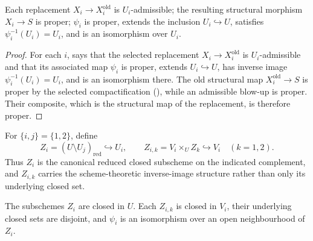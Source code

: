 \begin{lemma}
  \label{lemma:nagata-two-open-graph-extensions}
  \leanok

  Each replacement $X_i\to X_i^{\mathrm{old}}$ is $U_i$-admissible;
  the resulting structural morphism $X_i\to S$ is proper;
  $\psi_i$ is proper, extends the inclusion $U_i\hookrightarrow U$, satisfies
  $\psi_i^{-1}(U_i)=U_i$, and is an isomorphism over $U_i$.
\end{lemma}

\begin{proof}
  \leanok
  For each $i$,  says that the selected
  replacement $X_i\to X_i^{\mathrm{old}}$ is $U_i$-admissible and that its
  associated map $\psi_i$ is proper, extends $U_i\hookrightarrow U$, has
  inverse image $\psi_i^{-1}(U_i)=U_i$, and is an isomorphism there.  The
  old structural map $X_i^{\mathrm{old}}\to S$ is proper by the selected
  compactification (),
  while an admissible blow-up is proper.  Their composite,
  which is the structural map of the replacement, is therefore proper.
\end{proof}

\begin{definition}
  \label{def:nagata-two-open-boundary-loci}
  \leanok

  For $\{i,j\}=\{1,2\}$, define
  \[
    Z_i=(U\setminus U_j)_{\mathrm{red}}\hookrightarrow U_i,
    \qquad
    Z_{i,k}=V_i\times_U Z_k\hookrightarrow V_i
    \quad(k=1,2).
  \]
  Thus $Z_i$ is the canonical reduced closed subscheme on the indicated
  complement, and $Z_{i,k}$ carries the scheme-theoretic inverse-image
  structure rather than only its underlying closed set.
\end{definition}


\begin{lemma}
  \label{lemma:nagata-boundary-loci}
  \leanok

  The subschemes $Z_i$ are closed in $U$.  Each $Z_{i,k}$ is closed in
  $V_i$, their underlying closed sets are disjoint, and $\psi_i$ is an
  isomorphism over an open neighbourhood of $Z_i$.
\end{lemma}

